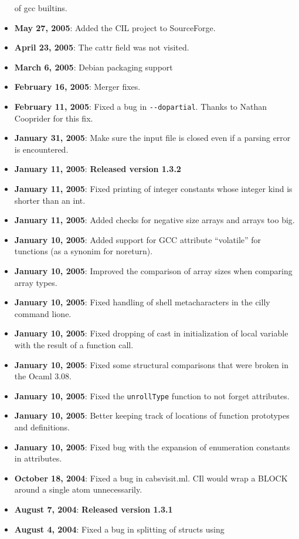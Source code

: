 \documentclass{article}
\def\t#1{{\tt #1}}
\begin{document}
\begin{itemize}
  of gcc builtins.
\item {\bf May 27, 2005}: Added the CIL project to SourceForge.
\item {\bf April 23, 2005}: The cattr field was not visited.
\item {\bf March 6, 2005}: Debian packaging support
\item {\bf February 16, 2005}: Merger fixes.
\item {\bf February 11, 2005}: Fixed a bug in \t{-{}-dopartial}. Thanks to
Nathan Cooprider for this fix. 
\item {\bf January 31, 2005}: Make sure the input file is closed even if a
  parsing error is encountered. 
\item {\bf January 11, 2005}: {\bf Released version 1.3.2}
\item {\bf January 11, 2005}: Fixed printing of integer constants whose
  integer kind is shorter than an int. 
\item {\bf January 11, 2005}: Added checks for negative size arrays and arrays
  too big. 
\item {\bf January 10, 2005}: Added support for GCC attribute ``volatile'' for
  tunctions (as a synonim for noreturn). 
\item {\bf January 10, 2005}: Improved the comparison of array sizes when
  comparing array types. 
\item {\bf January 10, 2005}: Fixed handling of shell metacharacters in the
  cilly command lione.
\item {\bf January 10, 2005}: Fixed dropping of cast in initialization of
  local variable with the result of a function call.
\item {\bf January 10, 2005}: Fixed some structural comparisons that were
  broken in the Ocaml 3.08.
\item {\bf January 10, 2005}: Fixed the \t{unrollType} function to not forget
  attributes. 
\item {\bf January 10, 2005}: Better keeping track of locations of function
  prototypes and definitions. 
\item {\bf January 10, 2005}: Fixed bug with the expansion of enumeration
  constants in attributes.
\item {\bf October 18, 2004}: Fixed a bug in cabsvisit.ml. CIl would wrap a
  BLOCK around a single atom unnecessarily. 
\item {\bf August 7, 2004}: {\bf Released version 1.3.1}
\item {\bf August 4, 2004}: Fixed a bug in splitting of structs using 

\end{itemize}
\end{document}

